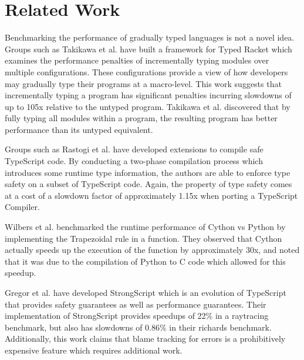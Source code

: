 \section{Related Work}\label{Related Work}
Benchmarking the performance of gradually typed languages is not a novel idea. Groups such as Takikawa et al. \cite{Takikawa:2016:SGT:2837614.2837630} have built a framework for Typed Racket which examines the performance penalties of incrementally typing modules over multiple configurations. These configurations provide a view of how developers may gradually type their programs at a macro-level. This work suggests that incrementally typing a program has significant penalties incurring slowdowns of up to 105x relative to the untyped program. Takikawa et al. discovered that by fully typing all modules within a program, the resulting program has better performance than its untyped equivalent.

Groups such as Rastogi et al. \cite{Rastogi:2015:SEG:2775051.2676971} have developed extensions to compile safe TypeScript code. By conducting a two-phase compilation process which introduces some runtime type information, the authors are able to enforce type safety on a subset of TypeScript code. Again, the property of type safety comes at a cost of a slowdown factor of approximately 1.15x when porting a TypeScript Compiler.

Wilbers et al. \cite{wilbers2009using} benchmarked the runtime performance of Cython vs Python by implementing the Trapezoidal rule in a function. They observed that Cython actually speeds up the execution of the function by approximately 30x, and noted that it was due to the compilation of Python to C code which allowed for this speedup. 

Gregor et al. \cite{richards2015concrete} have developed StrongScript which is an evolution of TypeScript that provides safety guarantees as well as performance guarantees. Their implementation of StrongScript provides speedups of 22\% in a raytracing benchmark, but also has slowdowns of 0.86\% in their richards benchmark. Additionally, this work claims that blame tracking for errors is a prohibitively expensive feature which requires additional work. 
